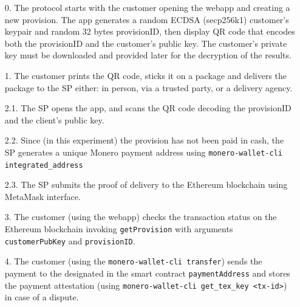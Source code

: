 \begin{enumerate}
  \setcounter{enumi}{0}
  \item[0.] The protocol starts with the customer opening the webapp and creating a new provision. 
The app generates a random ECDSA (secp256k1) customer's keypair and random 32 bytes provisionID, then display QR code that encodes both the provisionID and the customer's public key. 
The customer's private key must be downloaded and provided later for the decryption of the results.

  \item[1.] The customer prints the QR code, sticks it on a package and delivers the package to the SP either: in person, via a trusted party, or a delivery agency.

  \item[2.1.] The SP opens the app, and scans the QR code decoding the provisionID and the client's public key.

  \item[2.2.] Since (in this experiment) the provision has not been paid in cash, the SP generates a unique Monero payment address using \texttt{monero-wallet-cli integrated\_address} 
  \item[2.3.] The SP submits the proof of delivery to the Ethereum blockchain using MetaMask interface. 

  \item[3.] The customer (using the webapp) checks the transaction status on the Ethereum blockchain invoking \texttt{getProvision} with arguments \texttt{customerPubKey} and \texttt{provisionID}.

  \item[4.] The customer (using the \texttt{monero-wallet-cli transfer}) sends the payment to the designated in the smart contract \texttt{paymentAddress} and stores the payment attestation (using \texttt{monero-wallet-cli get\_tex\_key <tx-id>}) in case of a dispute.


\end{enumerate}
